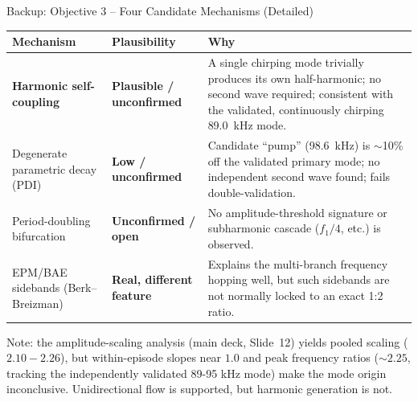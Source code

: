 \documentclass[aspectratio=169]{beamer}
\begin{document}
\begin{frame}{Backup: Objective 3 -- Four Candidate Mechanisms (Detailed)}
    \scriptsize
    \renewcommand{\arraystretch}{1.15}
    \setlength{\tabcolsep}{4pt}
    \begin{tabularx}{\textwidth}{@{}p{3.0cm}p{2.6cm}X@{}}
        \toprule
        \textbf{Mechanism} & \textbf{Plausibility} & \textbf{Why} \\
        \midrule
        \textbf{Harmonic self-coupling} & 
        \textcolor{orange!70!black}{\textbf{Plausible / unconfirmed}} &
        A single chirping mode trivially produces its own half-harmonic; no
        second wave required; consistent with the validated, continuously
        chirping \SI{89.0}{kHz} mode. \\
        \addlinespace
        Degenerate parametric decay (PDI) &
        \textcolor{orange!80!black}{\textbf{Low / unconfirmed}} &
        Candidate ``pump'' (\SI{98.6}{kHz}) is $\sim$10\% off the validated
        primary mode; no independent second wave found; fails
        double-validation. \\
        \addlinespace
        Period-doubling bifurcation &
        \textcolor{orange!80!black}{\textbf{Unconfirmed / open}} &
        No amplitude-threshold signature or subharmonic cascade ($f_1/4$, etc.)
        is observed. \\
        \addlinespace
        EPM/BAE sidebands (Berk--Breizman) &
        \textcolor{green!50!black}{\textbf{Real, different feature}} &
        Explains the multi-branch frequency hopping well, but such sidebands
        are not normally locked to an exact 1:2 ratio. \\
        \bottomrule
    \end{tabularx}
    \vspace{0.2cm}
    \normalsize
    Note: the amplitude-scaling analysis (main deck, Slide~12) yields
    pooled scaling ($2.10{-}2.26$), but within-episode slopes near $1.0$ and peak
    frequency ratios (${\sim}2.25$, tracking the independently validated 89-95 kHz mode) 
    make the mode origin inconclusive. Unidirectional flow is supported, but harmonic generation is not.
\end{frame}
\end{document}

